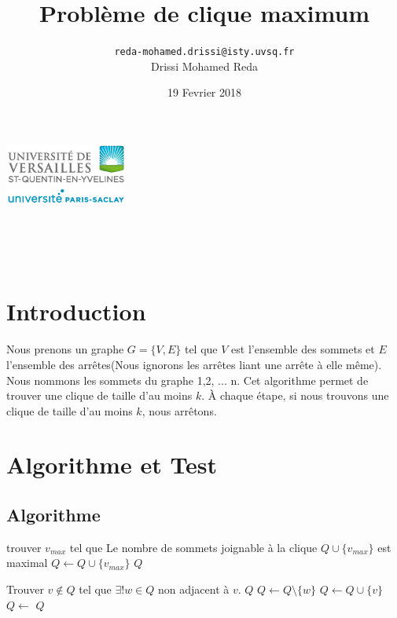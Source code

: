 \documentclass{article}
\title{\Huge Problème de clique maximum}
\author{\texttt{reda-mohamed.drissi@isty.uvsq.fr}\\
        Drissi Mohamed Reda}
\date{19 Fevrier 2018}
\begin{document}
\makeatletter
    \begin{titlepage}
        \begin{center}
        	\includegraphics[width=40mm]{Report/uvsq-header.png}\par \vspace{1cm}
            {\@title }\\[4ex]
            {\@author}\\[4ex]
            {\@date} \\ [4ex]
        \end{center}
    \end{titlepage}
\makeatother
\thispagestyle{empty}
\newpage
\tableofcontents
\newpage
\section{Introduction}
Nous prenons un graphe $G=\{V,E\}$ tel que $V$ est l'ensemble des sommets
et $E$ l'ensemble des arrêtes(Nous ignorons les arrêtes liant une arrête à elle même). \\
Nous nommons les sommets du graphe 1,2, ... n. Cet algorithme permet de trouver une clique
de taille d'au moins $k$. À chaque étape, si nous trouvons une clique de taille d'au moins
$k$, nous arrêtons.
\section{Algorithme et Test}
\subsection{Algorithme}
\begin{algorithm}
\begin{algorithmic}
    \State trouver $v_{max}$ tel que Le nombre de sommets joignable à la clique $Q \cup \{v_{max}\}$ est maximal
    \State $Q \gets Q\cup \{v_{max}\}$
  \EndWhile
    \State \Return $Q$
  \EndFunction
\end{algorithmic}
\end{algorithm}
\begin{algorithm}
\begin{algorithmic}
  \State Trouver $v \notin Q$ tel que $\exists! w \in Q$ non adjacent à $v$.
      \State \Return $Q$
    \Else
      \State $Q\gets Q \setminus \{w\}$
      \State $Q \gets Q \cup \{v\}$
      \State $Q \gets$ 
      \State \Return $Q$
    \EndIf
  \EndFunction
\end{algorithmic}
\end{algorithm}
\end{document}
